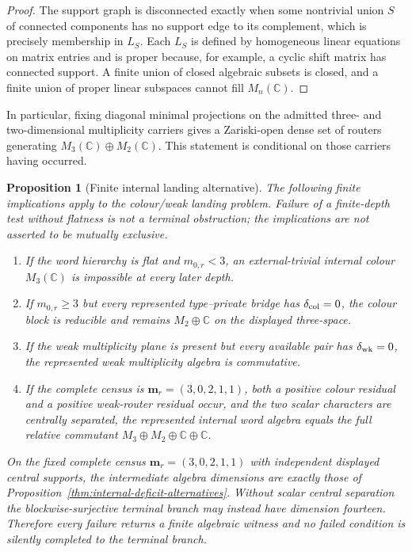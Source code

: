 \documentclass[11pt]{article}
\numberwithin{equation}{section}
\newtheorem{proposition}[theorem]{Proposition}
\theoremstyle{definition}
\theoremstyle{remark}
\newcommand{\C}{\mathbb C}
\begin{document}
\begin{proof}
The support graph is disconnected exactly when some nontrivial union $S$ of
connected components has no support edge to its complement, which is precisely
membership in $L_S$.  Each $L_S$ is defined by homogeneous linear equations
on matrix entries and is proper because, for example, a cyclic shift matrix
has connected support.  A finite union of closed algebraic subsets is closed,
and a finite union of proper linear subspaces cannot fill $M_n(\C)$.
\end{proof}

In particular, fixing diagonal minimal projections on the admitted
three- and two-dimensional multiplicity carriers gives a Zariski-open dense
set of routers generating $M_3(\C)\oplus M_2(\C)$.  This statement is
conditional on those carriers having occurred.

\begin{proposition}[Finite internal landing alternative]
\label{thm:finite-internal-landing-alternative}
The following finite implications apply to the colour/weak landing problem.
Failure of a finite-depth test without flatness is not a terminal obstruction;
the implications are not asserted to be mutually exclusive.
\begin{enumerate}[label=\textup{(A\arabic*)},leftmargin=3em]
\item If the word hierarchy is flat and $m_{0,r}<3$, an external-trivial
      internal colour $M_3(\C)$ is impossible at every later depth.
\item If $m_{0,r}\ge3$ but every represented type--private bridge has
      $\delta_{\rm col}=0$, the colour block is reducible and remains
      $M_2\oplus\C$ on the displayed three-space.
\item If the weak multiplicity plane is present but every available pair has
      $\delta_{\rm wk}=0$, the represented weak multiplicity algebra is
      commutative.
\item If the complete census is $\bm m_r=(3,0,2,1,1)$, both a positive colour
      residual and a positive weak-router residual occur, and the two scalar
      characters are centrally separated, the represented
      internal word algebra equals the full relative commutant
      $M_3\oplus M_2\oplus\C\oplus\C$.
\end{enumerate}
On the fixed complete census $\bm m_r=(3,0,2,1,1)$ with independent displayed central supports,
the intermediate algebra dimensions are exactly those of
Proposition~\ref{thm:internal-deficit-alternatives}.  Without scalar central
separation the blockwise-surjective terminal branch may instead have
dimension fourteen.  Therefore
every failure returns a finite algebraic witness and no failed condition is
silently completed to the terminal branch.
\end{proposition}
\end{document}
